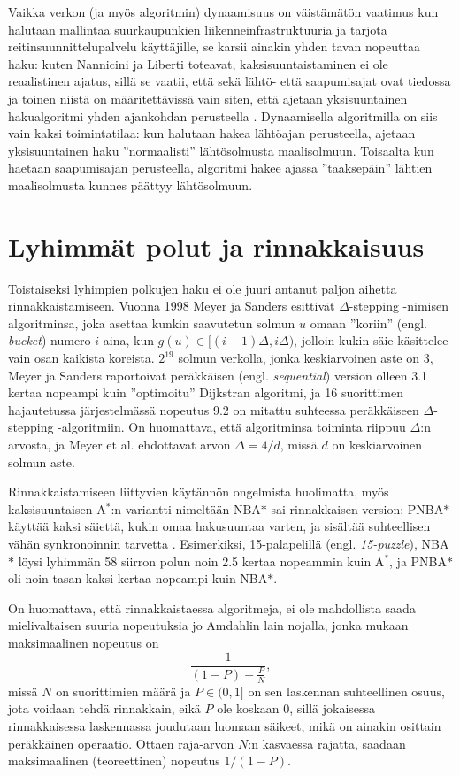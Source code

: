 \documentclass[finnish]{tktltiki2}
\theoremstyle{definition}
\theoremstyle{remark}
\begin{document}
Vaikka verkon (ja myös algoritmin) dynaamisuus on väistämätön vaatimus kun halutaan mallintaa suurkaupunkien liikenneinfrastruktuuria ja tarjota reitinsuunnittelupalvelu käyttäjille, se karsii ainakin yhden tavan nopeuttaa haku: kuten Nannicini ja Liberti toteavat, kaksisuuntaistaminen ei ole reaalistinen ajatus, sillä se vaatii, että sekä lähtö- että saapumisajat ovat tiedossa ja toinen niistä on määritettävissä vain siten, että ajetaan yksisuuntainen hakualgoritmi yhden ajankohdan perusteella \cite{Nannicini08}.
Dynaamisella algoritmilla on siis vain kaksi toimintatilaa: kun halutaan hakea lähtöajan perusteella, ajetaan yksisuuntainen haku ''normaalisti'' lähtösolmusta maalisolmuun. Toisaalta kun haetaan saapumisajan perusteella, algoritmi hakee ajassa ''taaksepäin'' lähtien maalisolmusta kunnes päättyy lähtösolmuun.

\section{Lyhimmät polut ja rinnakkaisuus}
\label{sec:parallel}
Toistaiseksi lyhimpien polkujen haku ei ole juuri antanut paljon aihetta rinnakkaistamiseen. Vuonna 1998 Meyer ja Sanders esittivät $\Delta$-stepping -nimisen algoritminsa, joka asettaa kunkin saavutetun solmun $u$ omaan ''koriin'' (engl. \textit{bucket}) numero $i$ aina, kun $g(u) \in [(i - 1)\Delta, i\Delta)$, jolloin kukin säie käsittelee vain osan kaikista koreista. $2^{19}$ solmun verkolla, jonka keskiarvoinen aste on 3, Meyer ja Sanders raportoivat peräkkäisen (engl. \textit{sequential}) version olleen 3.1 kertaa nopeampi kuin ''optimoitu'' Dijkstran algoritmi, ja 16 suorittimen hajautetussa järjestelmässä nopeutus 9.2 on mitattu suhteessa peräkkäiseen $\Delta$-stepping -algoritmiin. On huomattava, että algoritminsa toiminta riippuu $\Delta$:n arvosta, ja Meyer et al. ehdottavat arvon $\Delta = 4/d$, missä $d$ on keskiarvoinen solmun aste.

Rinnakkaistamiseen liittyvien käytännön ongelmista huolimatta, myös kaksisuuntaisen A$^{\ast}$:n variantti nimeltään NBA$\ast$ sai rinnakkaisen version: PNBA$\ast$ käyttää kaksi säiettä, kukin omaa hakusuuntaa varten, ja sisältää suhteellisen vähän synkronoinnin tarvetta \cite{Rios}. Esimerkiksi, 15-palapelillä (engl. \textit{15-puzzle}), NBA$\ast$ löysi lyhimmän 58 siirron polun noin 2.5 kertaa nopeammin kuin A$^{\ast}$, ja PNBA$\ast$ oli noin tasan kaksi kertaa nopeampi kuin NBA$\ast$.

On huomattava, että rinnakkaistaessa algoritmeja, ei ole mahdollista saada mielivaltaisen suuria nopeutuksia jo Amdahlin lain nojalla, jonka mukaan maksimaalinen nopeutus on
\[
\frac{1}{(1 - P) + \frac{P}{N}},
\]
missä $N$ on suorittimien määrä ja $P \in (0, 1]$ on sen laskennan suhteellinen osuus, jota voidaan tehdä rinnakkain, eikä $P$ ole koskaan 0, sillä jokaisessa rinnakkaisessa laskennassa joudutaan luomaan säikeet, mikä on ainakin osittain peräkkäinen operaatio. Ottaen raja-arvon $N$:n kasvaessa rajatta, saadaan maksimaalinen (teoreettinen) nopeutus $1 / (1 - P)$.
\end{document}
